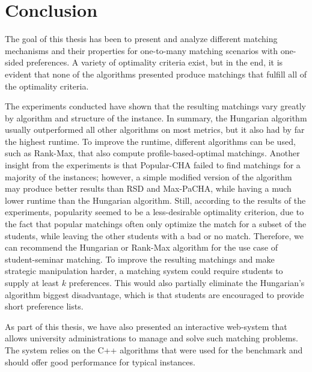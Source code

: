 \section{Conclusion}

The goal of this thesis has been to present and analyze different matching mechanisms and their properties for one-to-many matching scenarios with one-sided preferences. A variety of optimality criteria exist, but in the end, it is evident that none of the algorithms presented produce matchings that fulfill all of the optimality criteria. 

The experiments conducted have shown that the resulting matchings vary greatly by algorithm and structure of the instance. In summary, the Hungarian algorithm usually outperformed all other algorithms on most metrics, but it also had by far the highest runtime. To improve the runtime, different algorithms can be used, such as Rank-Max, that also compute profile-based-optimal matchings. Another insight from the experiments is that Popular-CHA failed to find matchings for a majority of the instances; however, a simple modified version of the algorithm may produce better results than RSD and Max-PaCHA, while having a much lower runtime than the Hungarian algorithm. Still, according to the results of the experiments, popularity seemed to be a less-desirable optimality criterion, due to the fact that popular matchings often only optimize the match for a subset of the students, while leaving the other students with a bad or no match. Therefore, we can recommend the Hungarian or Rank-Max algorithm for the use case of student-seminar matching. To improve the resulting matchings and make strategic manipulation harder, a matching system could require students to supply at least $k$ preferences. This would also partially eliminate the Hungarian's algorithm biggest disadvantage, which is that students are encouraged to provide short preference lists.

As part of this thesis, we have also presented an interactive web-system that allows university administrations to manage and solve such matching problems. The system relies on the C++ algorithms that were used for the benchmark and should offer good performance for typical instances.  